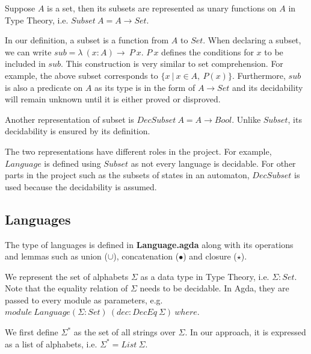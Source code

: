 \begin{defn} 
\noindent Suppose \(A\) is a set, then its
subsets are represented as unary functions on
\(A\) in Type Theory, i.e. \(Subset\ A = A \to Set\). 
\end{defn}

\par In our definition, a subset is a function from \(A\) to
\(Set\). When declaring a subset, we can write \(sub =
\lambda\ (x : A) \to\ P\ x\). \(P\ x\) defines the conditions for \(x\) to
be included in \(sub\). This construction is
very similar to set comprehension. For example, the above subset
corresponds to \(\{x\ | \ x \in A,\ P(x)\}\). Furthermore, \(sub\) is
also a predicate on \(A\) as its type is in the form of \(A \to
Set\) and its decidability will remain unknown until it is either proved or disproved. 

\begin{defn} 
\noindent Another representation of subset is \(DecSubset\ A = A \to
Bool\). Unlike \(Subset\), its decidability is ensured by its
definition. 
\end{defn}

\par The two representations have different roles in the project. For
example, \(Language\) is defined using \(Subset\) as not every
language is decidable. For other parts in the project 
such as the subsets of states in an automaton, \(DecSubset\) is used
because the decidability is assumed. 


\subsection{Languages}
\par The type of languages is defined in \textbf{Language.agda} along with its 
operations and lemmas such as union (\(\cup\)), concatenation
(\(\bullet\)) and closure (\(\star\)). 

\par We represent the set of alphabets \(\Sigma\) as a data type in
Type Theory, i.e. \(\Sigma : Set\). Note that the equality relation of \(\Sigma\) needs to be
decidable. In Agda, they are passed to every module as
parameters, e.g. \(module\ Language (\Sigma : Set)\ (dec : DecEq\
\Sigma)\ where\). 

\begin{defn}
\noindent We first define \(\Sigma^*\) as the set of all
strings over \(\Sigma\). In our approach, it is expressed as a list of
alphabets, i.e. \(\Sigma^* = List\ \Sigma\). 
\end{defn}

